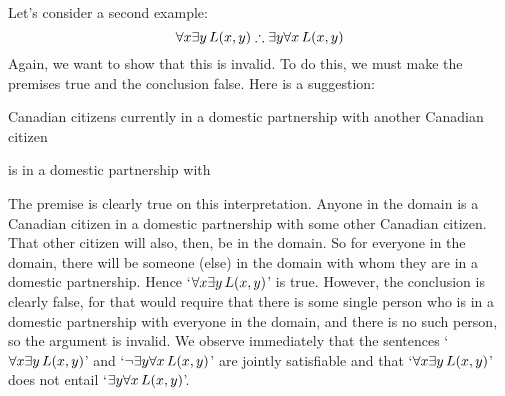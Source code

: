 Let's consider a second example:
$$\forall x \exists y\, \atom{L}{x,y} \therefore \exists y \forall x\, \atom{L}{x,y}$$
Again, we want to show that this is invalid. To do this, we must make the premises true and the conclusion false. Here is a suggestion:
\begin{ekey}
	\item[\text{domain}] Canadian citizens currently in a domestic partnership with another Canadian citizen
	\item[\atom{L}{x,y}]  is in a domestic partnership with 
\end{ekey}
The premise is clearly true on this interpretation. Anyone in the domain is a Canadian citizen in a domestic partnership with some other Canadian citizen. That other citizen will also, then, be in the domain. So for everyone in the domain, there will be someone (else) in the domain with whom they are in a domestic partnership. Hence `$\forall x \exists y\, \mathord{L}(x,y)$' is true. However, the conclusion is clearly false, for that would require that there is some single person who is in a domestic partnership with everyone in the domain, and there is no such person, so the argument is invalid. We observe immediately that the sentences `$\forall x \exists y\, \mathord{L}(x,y)$' and `$\neg\exists y \forall x\, \mathord{L}(x,y)$' are jointly satisfiable and that `$\forall x \exists y\, \mathord{L}(x,y)$' does not entail `$\exists y \forall x\, \mathord{L}(x,y)$'.


